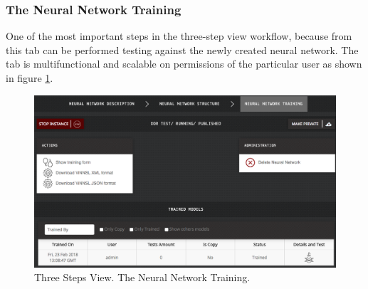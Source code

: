 \subsubsection{The Neural Network Training}

One of the most important steps in the three-step view workflow, because from this tab can be performed testing against the newly created neural network. The tab is multifunctional and scalable on permissions of the particular user as shown in figure \ref{fig:training_3_steps}.

\begin{figure}[H]
\begin{center}
  \includegraphics[width=\linewidth]{components/5/img/training_3_steps.png}
  \caption{Three Steps View. The Neural Network Training.}
  \label{fig:training_3_steps}
\end{center}
\end{figure}

